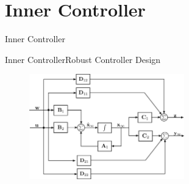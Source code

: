 \section{Inner Controller}

\begin{frame}{Inner Controller}{}

\end{frame}

\begin{frame}{Inner Controller}{Robust Controller Design}
    \begin{figure}[H]
        \centering
        \includegraphics[width=0.6\textwidth]{figures/HinfDiag}
    \end{figure}    
\end{frame}


